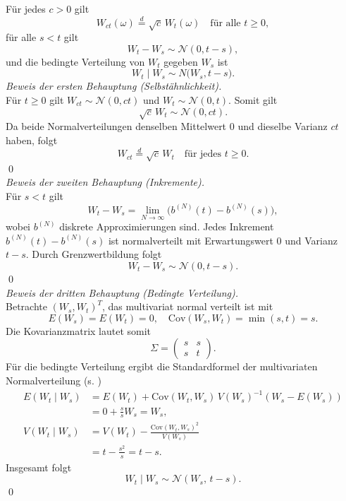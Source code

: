 \begin{satz}
Für jedes $c > 0$ gilt
$$
W_{ct}(\omega) \overset{d}{=} \sqrt{c}\, W_t(\omega) \quad \text{für alle } t \ge 0,
$$
für alle $s < t$ gilt
$$
W_t - W_s \sim \mathcal N(0, t-s),
$$
und die bedingte Verteilung von $W_t$ gegeben $W_s$ ist
$$
W_t \mid W_s \sim N\big(W_s, t-s\big).
$$
\textit{Beweis der ersten Behauptung (Selbstähnlichkeit).} \\
Für $t \ge 0$ gilt $W_{ct} \sim \mathcal N(0, ct)$ und $W_t \sim \mathcal N(0, t)$. Somit gilt
$$
\sqrt{c}\, W_t \sim \mathcal N(0, c t).
$$
Da beide Normalverteilungen denselben Mittelwert $0$ und dieselbe Varianz $ct$ haben, folgt
$$
W_{ct} \stackrel{d}{=} \sqrt{c}\, W_t \quad \text{für jedes } t \ge 0.
$$  
\qed  \\
\textit{Beweis der zweiten Behauptung (Inkremente).} \\
Für $s < t$ gilt
$$
W_t - W_s = \lim_{N \to \infty} \big( b^{(N)}(t) - b^{(N)}(s) \big),
$$
wobei $b^{(N)}$ diskrete Approximierungen sind. Jedes Inkrement $b^{(N)}(t) - b^{(N)}(s)$ ist normalverteilt mit Erwartungswert $0$ und Varianz $t-s$. Durch Grenzwertbildung folgt
$$
W_t - W_s \sim \mathcal N(0, t-s).
$$
\qed  \\
\textit{Beweis der dritten Behauptung (Bedingte Verteilung).} \\
Betrachte $(W_s, W_t)^T$, das multivariat normal verteilt ist mit
$$
E(W_s) = E(W_t) = 0, \quad
\mathrm{Cov}(W_s, W_t) = \min(s, t) = s.
$$  
Die Kovarianzmatrix lautet somit
$$
\Sigma = \begin{pmatrix} s & s \\ s & t \end{pmatrix}.
$$
Für die bedingte Verteilung ergibt die Standardformel der multivariaten Normalverteilung (s. \cite{soch_conditional_2020})
$$
\begin{aligned}
E(W_t \mid W_s) &= E(W_t) + \mathrm{Cov}(W_t, W_s)\,V(W_s)^{-1} (W_s - E(W_s)) \\
&= 0 + \frac{s}{s} W_s = W_s, \\
V(W_t \mid W_s) &= V(W_t) - \frac{\mathrm{Cov}(W_t, W_s)^2}{V(W_s)} \\
&= t - \frac{s^2}{s} = t - s.
\end{aligned}
$$
Insgesamt folgt
$$
W_t \mid W_s \sim \mathcal N(W_s,\, t-s).
$$ \qed
\end{satz}

